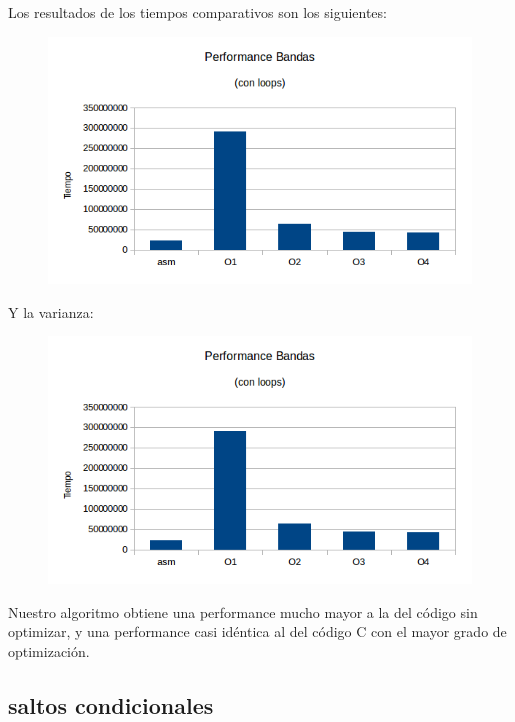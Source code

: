 \documentclass[a4paper]{article}
\begin{document}
Los resultados de los tiempos comparativos son los siguientes:

\begin{figure}[h!]
  \begin{center}
  \includegraphics[scale=0.66]{Graficos1.4/ban/PSO.png}
  \label{nombreparareferenciar9}
  \end{center}
\end{figure}

\newpage
Y la varianza:

\begin{figure}[h!]
  \begin{center}
  \includegraphics[scale=0.66]{Graficos1.4/ban/PSO.png}
  \label{nombreparareferenciar10}
  \end{center}
\end{figure}

Nuestro algoritmo obtiene una performance mucho mayor a la del código sin optimizar, y una performance casi idéntica al del código C con el mayor grado de optimización.

\newpage
\subsection{saltos condicionales}
\end{document}
